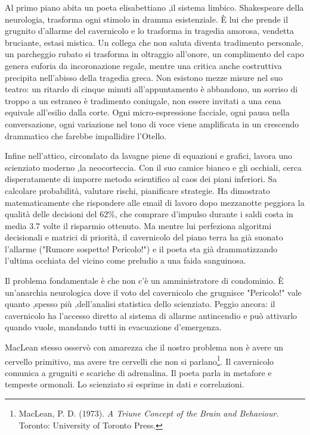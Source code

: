Al primo piano abita un poeta elisabettiano ,il sistema limbico. Shakespeare della neurologia, trasforma ogni stimolo in dramma esistenziale. È lui che prende il grugnito d'allarme del cavernicolo e lo trasforma in tragedia amorosa, vendetta bruciante, estasi mistica. Un collega che non saluta diventa tradimento personale, un parcheggio rubato si trasforma in oltraggio all'onore, un complimento del capo genera euforia da incoronazione regale, mentre una critica anche costruttiva precipita nell'abisso della tragedia greca. Non esistono mezze misure nel suo teatro: un ritardo di cinque minuti all'appuntamento è abbandono, un sorriso di troppo a un estraneo è tradimento coniugale, non essere invitati a una cena equivale all'esilio dalla corte. Ogni micro-espressione facciale, ogni pausa nella conversazione, ogni variazione nel tono di voce viene amplificata in un crescendo drammatico che farebbe impallidire l'Otello.

Infine nell'attico, circondato da lavagne piene di equazioni e grafici, lavora uno scienziato moderno ,la neocorteccia. Con il suo camice bianco e gli occhiali, cerca disperatamente di imporre metodo scientifico al caos dei piani inferiori. Sa calcolare probabilità, valutare rischi, pianificare strategie. Ha dimostrato matematicamente che rispondere alle email di lavoro dopo mezzanotte peggiora la qualità delle decisioni del 62\%, che comprare d'impulso durante i saldi costa in media 3.7 volte il risparmio ottenuto. Ma mentre lui perfeziona algoritmi decisionali e matrici di priorità, il cavernicolo del piano terra ha già suonato l'allarme ("Rumore sospetto! Pericolo!") e il poeta sta già drammatizzando l'ultima occhiata del vicino come preludio a una faida sanguinosa.

Il problema fondamentale è che non c'è un amministratore di condominio. È un'anarchia neurologica dove il voto del cavernicolo che grugnisce "Pericolo!" vale quanto ,spesso più ,dell'analisi statistica dello scienziato. Peggio ancora: il cavernicolo ha l'accesso diretto al sistema di allarme antincendio e può attivarlo quando vuole, mandando tutti in evacuazione d'emergenza.


MacLean stesso osservò con amarezza che il nostro problema non è avere un cervello primitivo, ma avere tre cervelli che non si parlano\footnote{MacLean, P. D. (1973). \textit{A Triune Concept of the Brain and Behaviour}. Toronto: University of Toronto Press.}. Il cavernicolo comunica a grugniti e scariche di adrenalina. Il poeta parla in metafore e tempeste ormonali. Lo scienziato si esprime in dati e correlazioni.

